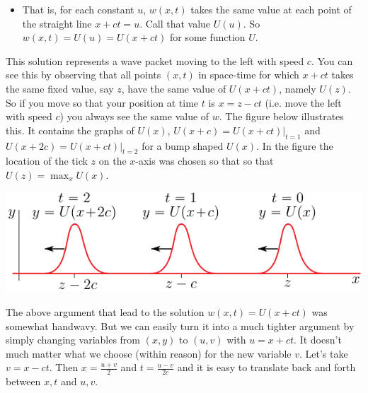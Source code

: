 \begin{itemize}
\item
That is, for each constant $u$, $w(x,t)$ takes the same value at each point
of the straight line $x+ct=u$. Call that value $U(u)$. So
$w(x,t)=U(u)=U(x+ct)$ for some function $U$.
\end{itemize}\noindent
This solution represents a wave packet moving to the left with speed $c$. 
You can see this by observing that all points $(x,t)$ in space-time for 
which $x+ct$ takes the same fixed value, say $z$, have the same value 
of $U(x+ct)$, namely $U(z)$. So if you move so that your position at 
time $t$ is $x=z-ct$  (i.e. move the left with speed $c$) you always 
see the same value of $w$.
The figure below illustrates this. It contains the graphs of $U(x)$, $U(x+c)
=U(x+ct)\big|_{t=1}$ and  $U(x+2c)=U(x+ct)\big|_{t=2}$ for a bump shaped
$U(x)$. In the figure the location of the tick $z$ on the
$x$-axis was chosen so that so that $U(z)=\max_x U(x)$.

\begin{efig}
\begin{center}
   \includegraphics{bumpLeft.pdf}
\end{center}
\end{efig}

The above argument that lead to the solution $w(x,t)=U(x+ct)$
was somewhat handwavy. But we can easily turn it into
a much tighter argument by simply changing variables from $(x,y)$
to $(u,v)$ with $u=x+ct$. It doesn't much matter what we choose
(within reason) for the new variable $v$. Let's take $v=x-ct$.
Then $x=\frac{u+v}{2}$ and $t=\frac{u-v}{2c}$ and it is easy to translate
back and forth between $x,t$ and $u,v$. 

